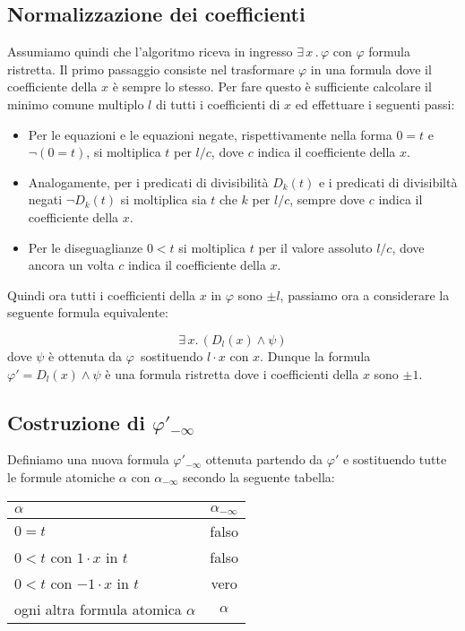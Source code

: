 \documentclass[11pt,letterpaper,twoside]{article}
\begin{document}
\subsection{Normalizzazione dei coefficienti}
Assumiamo quindi che l'algoritmo riceva in ingresso $\exists \, x \, . \,
\varphi$ con $\varphi$ formula ristretta. Il primo passaggio consiste nel
trasformare $\varphi$ in una formula dove il coefficiente della $x$ \`e sempre
lo stesso. Per fare questo \`e sufficiente calcolare il minimo comune multiplo
$l$ di tutti i coefficienti di $x$ ed effettuare i seguenti passi:
\begin{itemize}
  \item Per le equazioni e le equazioni negate, rispettivamente nella forma
    $0=t$ e $\lnot (0=t)$, si moltiplica $t$  per $l/c$, dove $c$ indica il
    coefficiente della $x$.
  \item Analogamente, per i predicati di divisibilit\`a $D_k(t)$ e i predicati
    di divisibilt\`a negati $\lnot D_k(t)$ si moltiplica sia $t$ che $k$ per
    $l/c$, sempre dove $c$ indica il coefficiente della $x$.
  \item Per le diseguaglianze $0<t$ si moltiplica $t$ per il valore assoluto
    $l/c$, dove ancora un volta $c$ indica il coefficiente della $x$.
  \end{itemize}

Quindi ora tutti i coefficienti della $x$ in $\varphi$ sono $\pm l$, passiamo
ora a considerare la seguente formula equivalente:

$$ \exists \, x . \, (D_l(x) \land \psi)  $$
dove $\psi$ \`e ottenuta da $\varphi$\ sostituendo $l \cdot x$ con $x$.
Dunque la formula $\varphi' = D_l(x) \land \psi$ \`e una formula ristretta dove
i coefficienti della $x$ sono $\pm 1$.

\subsection{Costruzione di $\varphi'_{- \infty}$}
Definiamo una nuova formula $\varphi'_{- \infty}$ ottenuta partendo da
$\varphi'$ e sostituendo tutte le formule atomiche $\alpha$ con $\alpha_{-
  \infty}$ secondo la seguente tabella:

\begin{center}
  \begin{tabular}{ l | c }
    $\alpha$ & $\alpha_{- \infty}$ \\ \hline
    $0=t$ & falso \\
    $0 < t$ con $1 \cdot x$ in $t$ & falso \\
    $0 < t$ con $-1 \cdot x$ in $t$ & vero \\
    ogni altra formula atomica $\alpha$ & $\alpha$ \\
  \end{tabular}
\end{center}
\end{document}
